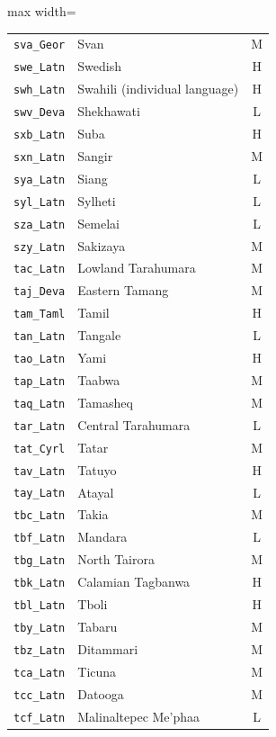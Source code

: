 {\begin{adjustbox}{max width=\textwidth}
\begin{tabular}{llc}
        \texttt{sva\_Geor} & Svan & M \\
        \texttt{swe\_Latn} & Swedish & H \\
        \texttt{swh\_Latn} & Swahili (individual language) & H \\
        \texttt{swv\_Deva} & Shekhawati & L \\
        \texttt{sxb\_Latn} & Suba & H \\
        \texttt{sxn\_Latn} & Sangir & M \\
        \texttt{sya\_Latn} & Siang & L \\
        \texttt{syl\_Latn} & Sylheti & L \\
        \texttt{sza\_Latn} & Semelai & L \\
        \texttt{szy\_Latn} & Sakizaya & M \\
        \texttt{tac\_Latn} & Lowland Tarahumara & M \\
        \texttt{taj\_Deva} & Eastern Tamang & M \\
        \texttt{tam\_Taml} & Tamil & H \\
        \texttt{tan\_Latn} & Tangale & L \\
        \texttt{tao\_Latn} & Yami & H \\
        \texttt{tap\_Latn} & Taabwa & M \\
        \texttt{taq\_Latn} & Tamasheq & M \\
        \texttt{tar\_Latn} & Central Tarahumara & L \\
        \texttt{tat\_Cyrl} & Tatar & M \\
        \texttt{tav\_Latn} & Tatuyo & H \\
        \texttt{tay\_Latn} & Atayal & L \\
        \texttt{tbc\_Latn} & Takia & M \\
        \texttt{tbf\_Latn} & Mandara & L \\
        \texttt{tbg\_Latn} & North Tairora & M \\
        \texttt{tbk\_Latn} & Calamian Tagbanwa & H \\
        \texttt{tbl\_Latn} & Tboli & H \\
        \texttt{tby\_Latn} & Tabaru & M \\
        \texttt{tbz\_Latn} & Ditammari & M \\
        \texttt{tca\_Latn} & Ticuna & M \\
        \texttt{tcc\_Latn} & Datooga & M \\
        \texttt{tcf\_Latn} & Malinaltepec Me'phaa & L \\

\end{tabular}
\end{adjustbox}}
